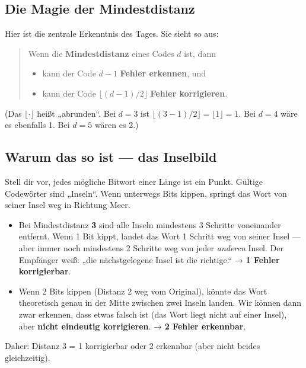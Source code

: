 \subsection*{Die Magie der Mindestdistanz}

Hier ist die zentrale Erkenntnis des Tages. Sie sieht so aus:

\begin{quote}
Wenn die \textbf{Mindestdistanz} eines Codes $d$ ist, dann
\begin{itemize}
\item kann der Code $d - 1$ \textbf{Fehler erkennen}, und
\item kann der Code $\lfloor (d-1)/2 \rfloor$ \textbf{Fehler korrigieren}.
\end{itemize}
\end{quote}

(Das $\lfloor \cdot \rfloor$ heißt „abrunden“. Bei $d = 3$ ist
$\lfloor (3-1)/2 \rfloor = \lfloor 1 \rfloor = 1$. Bei $d = 4$ wäre es
ebenfalls 1. Bei $d = 5$ wären es 2.)

\subsection*{Warum das so ist — das Inselbild}

Stell dir vor, jedes mögliche Bitwort einer Länge ist ein Punkt.
Gültige Codewörter sind „Inseln“. Wenn unterwegs Bits kippen, springt
das Wort von seiner Insel weg in Richtung Meer.

\begin{itemize}
\item Bei Mindestdistanz \textbf{3} sind alle Inseln mindestens 3
  Schritte voneinander entfernt. Wenn 1 Bit kippt, landet das Wort 1
  Schritt weg von seiner Insel — aber immer noch mindestens 2 Schritte
  weg von jeder \emph{anderen} Insel. Der Empfänger weiß: „die
  nächstgelegene Insel ist die richtige.“ → \textbf{1 Fehler
  korrigierbar}.
\item Wenn 2 Bits kippen (Distanz 2 weg vom Original), könnte das
  Wort theoretisch genau in der Mitte zwischen zwei Inseln landen.
  Wir können dann zwar erkennen, dass etwas falsch ist (das Wort
  liegt nicht auf einer Insel), aber \textbf{nicht eindeutig
  korrigieren}. → \textbf{2 Fehler erkennbar}.
\end{itemize}

Daher: Distanz 3 = 1 korrigierbar oder 2 erkennbar (aber nicht beides
gleichzeitig).

